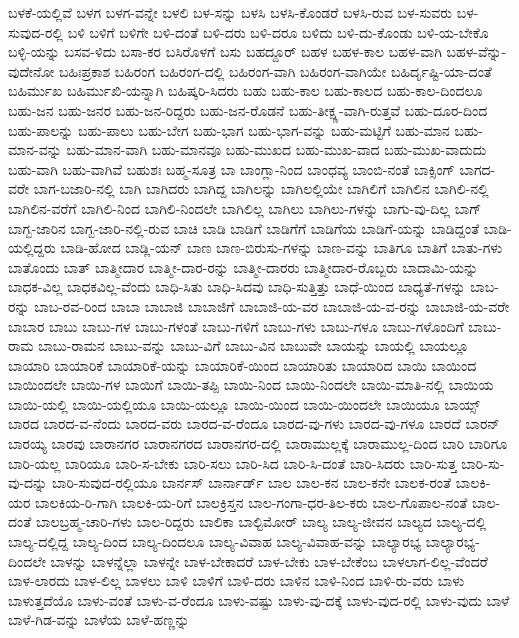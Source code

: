 {ಬಳಕೆ-ಯಲ್ಲಿವೆ
ಬಳಗ
ಬಳಗ-ವನ್ನೇ
ಬಳಲಿ
ಬಳ-ಸನ್ನು
ಬಳಸಿ
ಬಳಸಿ-ಕೊಂಡರೆ
ಬಳಸಿ-ರುವ
ಬಳ-ಸುವರು
ಬಳ-ಸುವುದ-ರಲ್ಲಿ
ಬಳಿ
ಬಳಿಗೆ
ಬಳಿಗೇ
ಬಳಿ-ದಂತೆ
ಬಳಿ-ದರು
ಬಳಿ-ದರೂ
ಬಳಿದು
ಬಳಿ-ದು-ಕೊಂಡು
ಬಳಿ-ಯ-ಬೇಕೊ
ಬಳ್ಳಿ-ಯನ್ನು
ಬಸವ-ಳಿದು
ಬಸಾ-ಕರ
ಬಸಿರೊಳಗೆ
ಬಸು
ಬಹದ್ದೂರ್
ಬಹಳ
ಬಹಳ-ಕಾಲ
ಬಹಳ-ವಾಗಿ
ಬಹಳ-ವೆನ್ನು-ವುದೇನೋ
ಬಹಿಃಪ್ರಕಾಶ
ಬಹಿರಂಗ
ಬಹಿರಂಗ-ದಲ್ಲಿ
ಬಹಿರಂಗ-ವಾಗಿ
ಬಹಿರಂಗ-ವಾಗಿಯೇ
ಬಹಿರ್ದೃಷ್ಟಿ-ಯಾ-ದಂತೆ
ಬಹಿರ್ಮುಖ
ಬಹಿರ್ಮುಖಿ-ಯನ್ನಾಗಿ
ಬಹಿಷ್ಕರಿ-ಸಿದರು
ಬಹು
ಬಹು-ಕಾಲ
ಬಹು-ಕಾಲದ
ಬಹು-ಕಾಲ-ದಿಂದಲೂ
ಬಹು-ಜನ
ಬಹು-ಜನರ
ಬಹು-ಜನ-ರಿದ್ದರು
ಬಹು-ಜನ-ರೊಡನೆ
ಬಹು-ತೀಕ್ಷ್ಣ-ವಾಗಿ-ರುತ್ತವೆ
ಬಹು-ದೂರ-ದಿಂದ
ಬಹು-ಪಾಲನ್ನು
ಬಹು-ಪಾಲು
ಬಹು-ಬೇಗ
ಬಹು-ಭಾಗ
ಬಹು-ಭಾಗ-ವನ್ನು
ಬಹು-ಮಟ್ಟಿಗೆ
ಬಹು-ಮಾನ
ಬಹು-ಮಾನ-ವನ್ನು
ಬಹು-ಮಾನ-ವಾಗಿ
ಬಹು-ಮಾನವೂ
ಬಹು-ಮುಖದ
ಬಹು-ಮುಖ-ವಾದ
ಬಹು-ಮುಖ-ವಾದುದು
ಬಹು-ವಾಗಿ
ಬಹು-ವಾಗಿವೆ
ಬಹುಶಃ
ಬಹ್ಮ-ಸೂತ್ರ
ಬಾ
ಬಾಂಗ್ಲಾ-ನಿಂದ
ಬಾಂಧವ್ಯ
ಬಾಂಬಿ-ನಂತೆ
ಬಾಕ್ಸಿಂಗ್
ಬಾಗದ-ವರೇ
ಬಾಗ-ಬಜಾರಿ-ನಲ್ಲಿ
ಬಾಗಿ
ಬಾಗಿದರು
ಬಾಗಿದ್ದ
ಬಾಗಿಲನ್ನು
ಬಾಗಿಲಲ್ಲಿಯೇ
ಬಾಗಿಲಿಗೆ
ಬಾಗಿಲಿನ
ಬಾಗಿಲಿ-ನಲ್ಲಿ
ಬಾಗಿಲಿನ-ವರೆಗೆ
ಬಾಗಿಲಿ-ನಿಂದ
ಬಾಗಿಲಿ-ನಿಂದಲೇ
ಬಾಗಿಲಿಲ್ಲ
ಬಾಗಿಲು
ಬಾಗಿಲು-ಗಳನ್ನು
ಬಾಗು-ವು-ದಿಲ್ಲ
ಬಾಗ್
ಬಾಗ್ಬ-ಜಾರಿನ
ಬಾಗ್ಬ-ಜಾರಿ-ನಲ್ಲಿ-ರುವ
ಬಾಚಿ
ಬಾಡಿ
ಬಾಡಿಗೆ
ಬಾಡಿಗೆಗೆ
ಬಾಡಿಗೆಯ
ಬಾಡಿಗೆ-ಯನ್ನು
ಬಾಡಿದ್ದಂತೆ
ಬಾಡಿ-ಯಲ್ಲಿದ್ದರು
ಬಾಡಿ-ಹೋದ
ಬಾಡ್ಲಿ-ಯನ್
ಬಾಣ
ಬಾಣ-ಬಿರುಸು-ಗಳನ್ನು
ಬಾಣ-ವನ್ನು
ಬಾತಿಗೂ
ಬಾತಿಗೆ
ಬಾತು-ಗಳು
ಬಾತೊಂದು
ಬಾತ್
ಬಾತ್ಮೀದಾರ
ಬಾತ್ಮೀ-ದಾರ-ರನ್ನು
ಬಾತ್ಮೀ-ದಾರರು
ಬಾತ್ಮೀದಾರ-ರೊಬ್ಬರು
ಬಾದಾಮಿ-ಯನ್ನು
ಬಾಧಕ-ವಿಲ್ಲ
ಬಾಧಕವಿಲ್ಲ-ವೆಂದು
ಬಾಧಿ-ಸಿತು
ಬಾಧಿ-ಸಿದವು
ಬಾಧಿ-ಸುತ್ತಿತ್ತು
ಬಾಧೆ-ಯಿಂದ
ಬಾಧ್ಯತೆ-ಗಳನ್ನು
ಬಾಬ-ರನ್ನು
ಬಾಬ-ರವ-ರಿಂದ
ಬಾಬಾ
ಬಾಬಾಜಿ
ಬಾಬಾಜಿಗೆ
ಬಾಬಾಜಿ-ಯ-ವರ
ಬಾಬಾಜಿ-ಯ-ವ-ರನ್ನು
ಬಾಬಾಜಿ-ಯ-ವರೇ
ಬಾಬಾರ
ಬಾಬು
ಬಾಬು-ಗಳ
ಬಾಬು-ಗಳಂತೆ
ಬಾಬು-ಗಳಿಗೆ
ಬಾಬು-ಗಳು
ಬಾಬು-ಗಳೂ
ಬಾಬು-ಗಳೊಂದಿಗೆ
ಬಾಬು-ರಾಮ
ಬಾಬು-ರಾಮನ
ಬಾಬು-ವನ್ನು
ಬಾಬು-ವಿಗೆ
ಬಾಬು-ವಿನ
ಬಾಬುವೇ
ಬಾಯನ್ನು
ಬಾಯಲ್ಲಿ
ಬಾಯಲ್ಲೂ
ಬಾಯಾರಿ
ಬಾಯಾರಿಕೆ
ಬಾಯಾರಿಕೆ-ಯನ್ನು
ಬಾಯಾರಿಕೆ-ಯಿಂದ
ಬಾಯಾರಿತು
ಬಾಯಾರಿದ
ಬಾಯಿ
ಬಾಯಿಂದ
ಬಾಯಿಂದಲೇ
ಬಾಯಿ-ಗಳ
ಬಾಯಿಗೆ
ಬಾಯಿ-ತಪ್ಪಿ
ಬಾಯಿ-ನಿಂದ
ಬಾಯಿ-ನಿಂದಲೇ
ಬಾಯಿ-ಮಾತಿ-ನಲ್ಲಿ
ಬಾಯಿಯ
ಬಾಯಿ-ಯಲ್ಲಿ
ಬಾಯಿ-ಯಲ್ಲಿಯೂ
ಬಾಯಿ-ಯಲ್ಲೂ
ಬಾಯಿ-ಯಿಂದ
ಬಾಯಿ-ಯಿಂದಲೇ
ಬಾಯಿಯೂ
ಬಾಯ್ಸ್
ಬಾರದ
ಬಾರದ-ವ-ನೆಂದು
ಬಾರದ-ವರು
ಬಾರದ-ವ-ರೆಂದೂ
ಬಾರದ-ವು-ಗಳು
ಬಾರದ-ವು-ಗಳೂ
ಬಾರದೆ
ಬಾರನ್
ಬಾರಯ್ಯ
ಬಾರವು
ಬಾರಾನಗರ
ಬಾರಾನಗರದ
ಬಾರಾನಗರ-ದಲ್ಲಿ
ಬಾರಾಮುಲ್ಲಕ್ಕೆ
ಬಾರಾಮುಲ್ಲ-ದಿಂದ
ಬಾರಿ
ಬಾರಿಗೂ
ಬಾರಿ-ಯಲ್ಲ
ಬಾರಿಯೂ
ಬಾರಿ-ಸ-ಬೇಕು
ಬಾರಿ-ಸಲು
ಬಾರಿ-ಸಿದ
ಬಾರಿ-ಸಿ-ದಂತೆ
ಬಾರಿ-ಸಿದರು
ಬಾರಿ-ಸುತ್ತ
ಬಾರಿ-ಸು-ವು-ದನ್ನು
ಬಾರಿ-ಸುವುದ-ರಲ್ಲಿಯೂ
ಬಾರ್ನಸ್
ಬಾರ್ನಾರ್ಡ್
ಬಾಲ
ಬಾಲ-ಕನ
ಬಾಲ-ಕನೇ
ಬಾಲಕ-ರಂತೆ
ಬಾಲಕಿ-ಯರ
ಬಾಲಕಿಯ-ರಿ-ಗಾಗಿ
ಬಾಲಕಿ-ಯ-ರಿಗೆ
ಬಾಲಕ್ರಿಸ್ತನ
ಬಾಲ-ಗಂಗಾ-ಧರ-ತಿಲ-ಕರು
ಬಾಲ-ಗೊಪಾಲ-ನಂತೆ
ಬಾಲ-ದಂತೆ
ಬಾಲಬ್ರಹ್ಮ-ಚಾರಿ-ಗಳು
ಬಾಲ-ರಿದ್ದರು
ಬಾಲಿಕಾ
ಬಾಲ್ಟಿಮೋರ್
ಬಾಲ್ಯ
ಬಾಲ್ಯ-ಜೀವನ
ಬಾಲ್ಯದ
ಬಾಲ್ಯ-ದಲ್ಲಿ
ಬಾಲ್ಯ-ದಲ್ಲಿದ್ದ
ಬಾಲ್ಯ-ದಿಂದ
ಬಾಲ್ಯ-ದಿಂದಲೂ
ಬಾಲ್ಯ-ವಿವಾಹ
ಬಾಲ್ಯ-ವಿವಾಹ-ವನ್ನು
ಬಾಲ್ಯಾರಭ್ಯ
ಬಾಲ್ಯಾರಭ್ಯ-ದಿಂದಲೇ
ಬಾಳನ್ನು
ಬಾಳನ್ನೆಲ್ಲಾ
ಬಾಳನ್ನೇ
ಬಾಳ-ಬೇಕಾದರೆ
ಬಾಳ-ಬೇಕು
ಬಾಳ-ಬೇಕೆಂಬ
ಬಾಳಲಾಗ-ಲಿಲ್ಲ-ವೆಂದರೆ
ಬಾಳ-ಲಾರದು
ಬಾಳ-ಲಿಲ್ಲ
ಬಾಳಲು
ಬಾಳಿ
ಬಾಳಿಗೆ
ಬಾಳಿ-ದರು
ಬಾಳಿನ
ಬಾಳಿ-ನಿಂದ
ಬಾಳಿ-ರು-ವರು
ಬಾಳು
ಬಾಳುತ್ತದೆಯೊ
ಬಾಳು-ವಂತೆ
ಬಾಳು-ವ-ರೆಂದೂ
ಬಾಳು-ವಷ್ಟು
ಬಾಳು-ವು-ದಕ್ಕೆ
ಬಾಳು-ವುದ-ರಲ್ಲಿ
ಬಾಳು-ವುದು
ಬಾಳೆ
ಬಾಳೆ-ಗಿಡ-ವನ್ನು
ಬಾಳೆಯ
ಬಾಳೆ-ಹಣ್ಣನ್ನು
}
